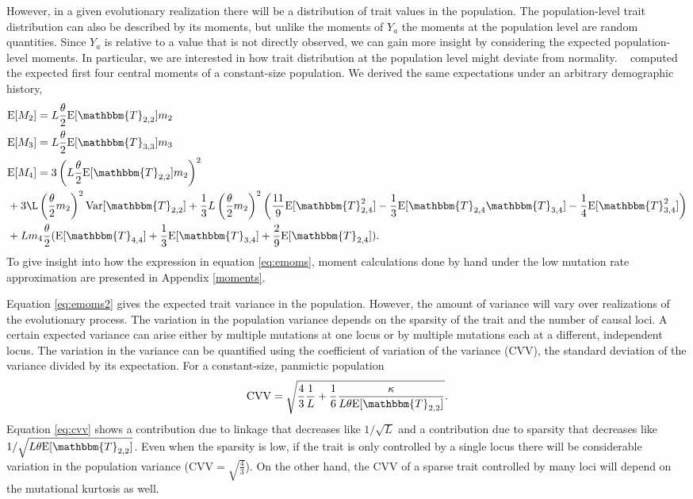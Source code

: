 However, in a given evolutionary realization there will be a distribution of
trait values in the population. The population-level trait distribution can also
be described by its moments, but unlike the moments of $Y_a$ the moments at the
population level are random quantities. Since $Y_a$ is relative to a value that
is not directly observed, we can gain more insight by considering the expected
population-level moments. In particular, we are interested in how trait
distribution at the population level might deviate from normality.
~\citet{Schraiber2015} computed the expected first four central moments of a
constant-size population. We derived the same expectations under an arbitrary
demographic history,
\begin{subequations} \label{eq:emoms}
\begin{align}
  &\E[M_2] = L \T \E[\mathbbm{T}_{2,2}] m_2 \label{eq:emoms2}\\
  &\E[M_3] = L \T \E[\mathbbm{T}_{3,3}] m_3  \label{eq:emoms3}\\
  &\E[M_4] = 3\left(L \T \E[\mathbbm{T}_{2,2}] m_2\right)^2 \nonumber \\
  &+ 3\L \left(\T m_2\right)^2\Var[\mathbbm{T}_{2,2}] + \frac{1}{3}
  L \left(\T m_2\right)^2
    \left( \frac{11}{9} \E[\mathbbm{T}_{2,4}^2]-\frac{1}{3}\E[\mathbbm{T}_{2,4}\mathbbm{T}_{3,4}]-
    \frac{1}{4}\E[\mathbbm{T}_{3,4}^2]\right) \nonumber \\
  &+ L m_4 \T ( \E[\mathbbm{T}_{4,4}] + \frac{1}{3} \E[\mathbbm{T}_{3,4}] +
    \frac{2}{9} \E[\mathbbm{T}_{2,4}] ).
  \label{eq:emoms4}
\end{align}
\end{subequations}
To give insight into how the expression in equation \eqref{eq:emoms}, moment
calculations done by hand under the low mutation rate approximation are
presented in Appendix \ref{moments}.

Equation \eqref{eq:emoms2} gives the expected trait variance in the population.
However, the amount of variance will vary over realizations of the evolutionary
process. The variation in the population variance depends on the sparsity of the
trait and the number of causal loci. A certain expected variance can arise
either by multiple mutations at one locus or by multiple mutations each at a
different, independent locus. The variation in the variance can be quantified
using the coefficient of variation of the variance (CVV), the standard deviation
of the variance divided by its expectation. For a constant-size, panmictic
population
\begin{equation}
  \label{eq:cvv}
  \mathrm{CVV} = \sqrt{\frac{4}{3}\frac{1}{L} +
    \frac{1}{6}\frac{\kappa}{L\theta \E[\mathbbm{T}_{2,2}]}}.
\end{equation}
Equation \eqref{eq:cvv} shows a contribution due to linkage that decreases like
$1/\sqrt{L}$ and a contribution due to sparsity that decreases like
$1/\sqrt{L\theta \E[\mathbbm{T}_{2,2}]}$. Even when the sparsity is low, if the
trait is only controlled by a single locus there will be considerable variation
in the population variance (CVV$=\sqrt{\frac{4}{3}}$). On the other hand, the
CVV of a sparse trait controlled by many loci will depend on the mutational
kurtosis as well.
